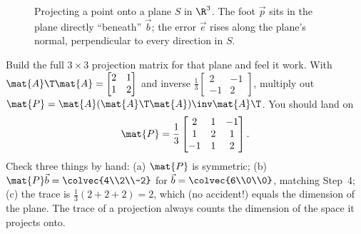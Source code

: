 \begin{figure}[H]
\centering
{}
\caption{Projecting a point onto a plane $S$ in $\R^3$. The foot $\vec{p}$ sits in the plane
directly ``beneath'' $\vec{b}$; the error $\vec{e}$ rises along the plane's normal, perpendicular
to every direction in $S$.}
\label{ch18:plane-fig}
\end{figure}

\begin{labbox}
Build the full $3\times3$ projection matrix for that plane and feel it work. With
$\mat{A}\T\mat{A}=\begin{bmatrix}2&1\\1&2\end{bmatrix}$ and inverse
$\frac13\begin{bmatrix}2&-1\\-1&2\end{bmatrix}$, multiply out
$\mat{P}=\mat{A}(\mat{A}\T\mat{A})\inv\mat{A}\T$. You should land on
\[
  \mat{P} = \frac{1}{3}\begin{bmatrix} 2 & 1 & -1 \\ 1 & 2 & 1 \\ -1 & 1 & 2 \end{bmatrix}.
\]
Check three things by hand: (a) $\mat{P}$ is symmetric; (b) $\mat{P}\vec{b}=\colvec{4\\2\\-2}$ for
$\vec{b}=\colvec{6\\0\\0}$, matching Step~4; (c) the trace is $\frac13(2+2+2)=2$, which (no
accident!) equals the dimension of the plane. The trace of a projection always counts the
dimension of the space it projects onto.
\end{labbox}

